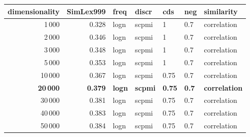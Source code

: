 \begin{tabular}{rrlllll}
\toprule
 dimensionality &  SimLex999 &  freq &  discr &   cds &  neg &   similarity \\
\midrule
           1\,000 &      0.328 &  logn &  scpmi &     1 &  0.7 &  correlation \\
           2\,000 &      0.346 &  logn &  scpmi &     1 &  0.7 &  correlation \\
           3\,000 &      0.348 &  logn &  scpmi &     1 &  0.7 &  correlation \\
           5\,000 &      0.353 &  logn &  scpmi &     1 &  0.7 &  correlation \\
          10\,000 &      0.367 &  logn &  scpmi &  0.75 &  0.7 &  correlation \\
          \textbf{20\,000} &      \textbf{0.379} &  \textbf{logn} &  \textbf{scpmi} &  \textbf{0.75} &  \textbf{0.7} &  \textbf{correlation} \\
          30\,000 &      0.381 &  logn &  scpmi &  0.75 &  0.7 &  correlation \\
          40\,000 &      0.383 &  logn &  scpmi &  0.75 &  0.7 &  correlation \\
          50\,000 &      0.384 &  logn &  scpmi &  0.75 &  0.7 &  correlation \\
\bottomrule
\end{tabular}
